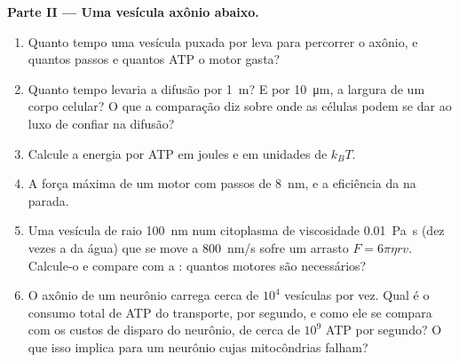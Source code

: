 \begin{problem}
\medskip
\noindent\textbf{Parte II --- Uma vesícula axônio abaixo.}
\begin{enumerate}[resume]
  \item Quanto tempo uma vesícula puxada por  leva para
        percorrer o axônio, e quantos passos e quantos ATP o motor
        gasta?
  \item Quanto tempo levaria a difusão por \qty{1}{m}? E por
        \qty{10}{\micro m}, a largura de um corpo celular? O que a
        comparação diz sobre onde as células podem se dar ao luxo de
        confiar na difusão?
  \item Calcule a energia por ATP em joules e em unidades de $k_{B}T$.
  \item A força máxima de um motor com passos de \qty{8}{nm}, e a
        eficiência da  na parada.
  \item Uma vesícula de raio \qty{100}{nm} num citoplasma de
        viscosidade \qty{0.01}{Pa.s} (dez vezes a da água) que se move
        a \qty{800}{nm/s} sofre um arrasto $F = 6\pi\eta r v$.
        Calcule-o e compare com a : quantos motores são
        necessários?
  \item O axônio de um neurônio carrega cerca de $10^{4}$ vesículas por
        vez. Qual é o consumo total de ATP do transporte, por segundo,
        e como ele se compara com os custos de disparo do neurônio, de
        cerca de $10^{9}$ ATP por segundo? O que isso implica para um
        neurônio cujas mitocôndrias falham?
\end{enumerate}


\end{problem}
